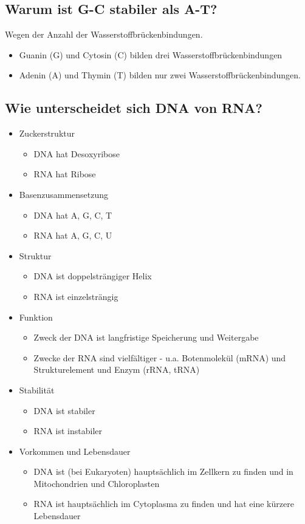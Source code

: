 \documentclass{article}
\begin{document}
\subsection*{Warum ist G-C stabiler als A-T?}
Wegen der Anzahl der Wasserstoffbrückenbindungen. 
\begin{itemize}
    \item Guanin (G) und Cytosin (C) bilden drei Wasserstoffbrückenbindungen
    \item Adenin (A) und Thymin (T) bilden nur zwei Wasserstoffbrückenbindungen.
\end{itemize}

\subsection*{Wie unterscheidet sich DNA von RNA?}
\begin{itemize}
    \item Zuckerstruktur
    \begin{itemize}
        \item DNA hat Desoxyribose
        \item RNA hat Ribose
    \end{itemize}
    \item Basenzusammensetzung
    \begin{itemize}
        \item DNA hat A, G, C, T
        \item RNA hat A, G, C, U
    \end{itemize}
    \item Struktur
    \begin{itemize}
        \item DNA ist doppelsträngiger Helix
        \item RNA ist einzelsträngig
    \end{itemize}
    \item Funktion
    \begin{itemize}
        \item Zweck der DNA ist langfristige Speicherung und Weitergabe 
        \item Zwecke der RNA sind vielfältiger - u.a. Botenmolekül (mRNA) und Strukturelement und Enzym (rRNA, tRNA)
    \end{itemize}
    \item Stabilität
    \begin{itemize}
        \item DNA ist stabiler
        \item RNA ist instabiler
    \end{itemize}
    \item Vorkommen und Lebensdauer
    \begin{itemize}
        \item DNA ist (bei Eukaryoten) hauptsächlich im Zellkern zu finden und in Mitochondrien und Chloroplasten
        \item RNA ist hauptsächlich im Cytoplasma zu finden und hat eine kürzere Lebensdauer
    \end{itemize}
\end{itemize}
\end{document}
